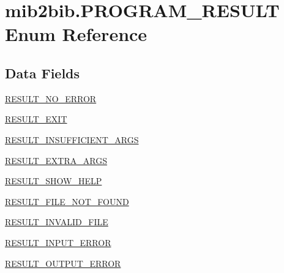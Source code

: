\hypertarget{enummib2bib_1_1mib2bib_1_1_p_r_o_g_r_a_m___r_e_s_u_l_t}{}\section{mib2bib.\+P\+R\+O\+G\+R\+A\+M\+\_\+\+R\+E\+S\+U\+L\+T Enum Reference}
\label{enummib2bib_1_1mib2bib_1_1_p_r_o_g_r_a_m___r_e_s_u_l_t}
\subsection*{Data Fields}
\begin{DoxyCompactItemize}
\item 
\hyperlink{enummib2bib_1_1mib2bib_1_1_p_r_o_g_r_a_m___r_e_s_u_l_t_a59752d22421a249938e84186bd669ed2}{R\+E\+S\+U\+L\+T\+\_\+\+N\+O\+\_\+\+E\+R\+R\+O\+R}
\item 
\hyperlink{enummib2bib_1_1mib2bib_1_1_p_r_o_g_r_a_m___r_e_s_u_l_t_acfe5ddacc6de80aec8f2895e7c274464}{R\+E\+S\+U\+L\+T\+\_\+\+E\+X\+I\+T}
\item 
\hyperlink{enummib2bib_1_1mib2bib_1_1_p_r_o_g_r_a_m___r_e_s_u_l_t_aaf3047b5c5929110fb886f2b916a05af}{R\+E\+S\+U\+L\+T\+\_\+\+I\+N\+S\+U\+F\+F\+I\+C\+I\+E\+N\+T\+\_\+\+A\+R\+G\+S}
\item 
\hyperlink{enummib2bib_1_1mib2bib_1_1_p_r_o_g_r_a_m___r_e_s_u_l_t_a9a35d2685e1f99732e905eec5d91ffa7}{R\+E\+S\+U\+L\+T\+\_\+\+E\+X\+T\+R\+A\+\_\+\+A\+R\+G\+S}
\item 
\hyperlink{enummib2bib_1_1mib2bib_1_1_p_r_o_g_r_a_m___r_e_s_u_l_t_aada2fade94cff321d65d62212c878422}{R\+E\+S\+U\+L\+T\+\_\+\+S\+H\+O\+W\+\_\+\+H\+E\+L\+P}
\item 
\hyperlink{enummib2bib_1_1mib2bib_1_1_p_r_o_g_r_a_m___r_e_s_u_l_t_aed9077e34e11c271b26f766c4f393cc4}{R\+E\+S\+U\+L\+T\+\_\+\+F\+I\+L\+E\+\_\+\+N\+O\+T\+\_\+\+F\+O\+U\+N\+D}
\item 
\hyperlink{enummib2bib_1_1mib2bib_1_1_p_r_o_g_r_a_m___r_e_s_u_l_t_ab4cc9dd9e07f4e131c8efe094f747662}{R\+E\+S\+U\+L\+T\+\_\+\+I\+N\+V\+A\+L\+I\+D\+\_\+\+F\+I\+L\+E}
\item 
\hyperlink{enummib2bib_1_1mib2bib_1_1_p_r_o_g_r_a_m___r_e_s_u_l_t_aa3a9f9804a302a0fec604270d9a20356}{R\+E\+S\+U\+L\+T\+\_\+\+I\+N\+P\+U\+T\+\_\+\+E\+R\+R\+O\+R}
\item 
\hyperlink{enummib2bib_1_1mib2bib_1_1_p_r_o_g_r_a_m___r_e_s_u_l_t_a3d319bb21fffbe71cba6dcf8673046e5}{R\+E\+S\+U\+L\+T\+\_\+\+O\+U\+T\+P\+U\+T\+\_\+\+E\+R\+R\+O\+R}
\end{DoxyCompactItemize}


